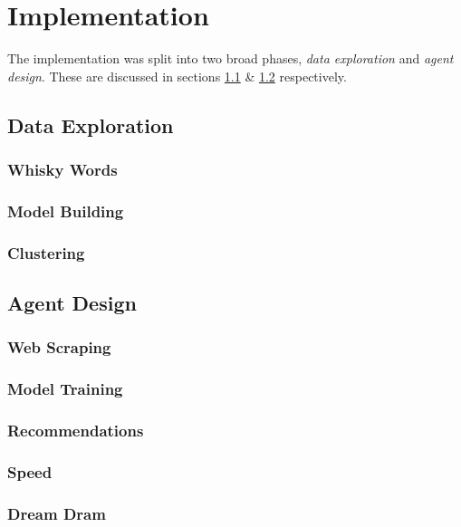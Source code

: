 \section{Implementation}\label{sec:imp}

The implementation was split into two broad phases, \emph{data exploration} and
\emph{agent design}. These are discussed in sections \ref{ssec:phase1} \& 
\ref{ssec:phase2} respectively.

\subsection{Data Exploration}\label{ssec:phase1}
\subsubsection{Whisky Words}\label{words}

\subsubsection{Model Building}

\subsubsection{Clustering}

\subsection{Agent Design}\label{ssec:phase2}

\subsubsection{Web Scraping}

\subsubsection{Model Training}

\subsubsection{Recommendations}

\subsubsection{Speed}

\subsubsection{Dream Dram}

